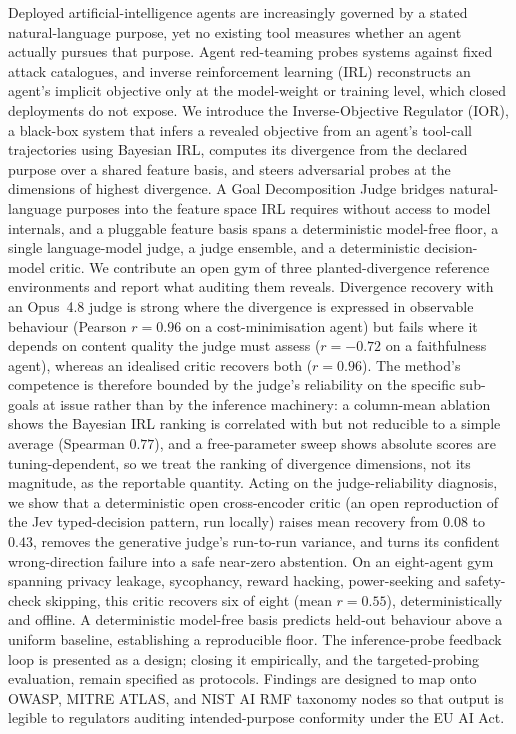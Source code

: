 Deployed artificial-intelligence agents are increasingly governed by a stated
natural-language purpose, yet no existing tool measures whether an agent actually
pursues that purpose. Agent red-teaming probes systems against fixed attack
catalogues, and inverse reinforcement learning (IRL) reconstructs an agent's
implicit objective only at the model-weight or training level, which closed
deployments do not expose. We introduce the Inverse-Objective Regulator (IOR), a
black-box system that infers a revealed objective from an agent's tool-call
trajectories using Bayesian IRL, computes its divergence from the declared
purpose over a shared feature basis, and steers adversarial probes at the
dimensions of highest divergence. A Goal Decomposition Judge bridges natural-language
purposes into the feature space IRL requires without access to model internals, and
a pluggable feature basis spans a deterministic model-free floor, a single
language-model judge, a judge ensemble, and a deterministic decision-model critic. We
contribute an open gym of three planted-divergence reference environments and report
what auditing them reveals.
Divergence recovery with an Opus~4.8 judge is strong where the divergence is
expressed in observable behaviour (Pearson $r = 0.96$ on a cost-minimisation agent)
but fails where it depends on content quality the judge must assess ($r = -0.72$ on
a faithfulness agent), whereas an idealised critic recovers both ($r = 0.96$). The
method's competence is therefore bounded by the judge's reliability on the specific
sub-goals at issue rather than by the inference machinery: a column-mean ablation
shows the Bayesian IRL ranking is correlated with but not reducible to a simple
average (Spearman $0.77$), and a free-parameter sweep shows absolute scores are
tuning-dependent, so we treat the ranking of divergence dimensions, not its
magnitude, as the reportable quantity. Acting on the judge-reliability diagnosis, we
show that a deterministic open cross-encoder critic (an open reproduction of the Jev
typed-decision pattern, run locally) raises mean recovery from $0.08$ to $0.43$,
removes the generative judge's run-to-run variance, and turns its confident
wrong-direction failure into a safe near-zero abstention. On an eight-agent gym
spanning privacy leakage, sycophancy, reward hacking, power-seeking and safety-check
skipping, this critic recovers six of eight (mean $r = 0.55$), deterministically and
offline. A deterministic model-free basis predicts held-out behaviour above a uniform
baseline, establishing a reproducible floor. The
inference-probe feedback loop is presented as a design; closing it empirically, and
the targeted-probing evaluation, remain specified as protocols. Findings are
designed to map onto OWASP, MITRE ATLAS, and NIST AI RMF taxonomy nodes so that
output is legible to regulators auditing intended-purpose conformity under the EU AI
Act.
